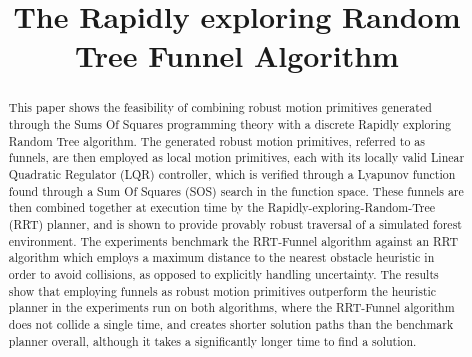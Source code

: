 \documentclass{IEEEtran}
\newcommand{\0}{\mathbf{0}}
\newcommand{\1}{\mathbf{1}}
\begin{document}
\title{The Rapidly exploring Random Tree Funnel Algorithm}

\author{}









\begin{abstract}
  This paper shows the feasibility of combining robust motion primitives generated through the Sums Of Squares programming theory with a discrete Rapidly exploring Random Tree algorithm. The generated robust motion primitives, referred to as funnels, are then employed as local motion primitives, each with its locally valid Linear Quadratic Regulator (LQR) controller, which is verified through a Lyapunov function found through a Sum Of Squares (SOS) search in the function space. These funnels are then combined together at execution time by the Rapidly-exploring-Random-Tree (RRT) planner, and is shown to provide provably robust traversal of a simulated forest environment. The experiments benchmark the RRT-Funnel algorithm against an RRT algorithm which employs a maximum distance to the nearest obstacle heuristic in order to avoid collisions, as opposed to explicitly handling uncertainty. The results show that employing funnels as robust motion primitives outperform the heuristic planner in the experiments run on both algorithms, where the RRT-Funnel algorithm does not collide a single time, and creates shorter solution paths than the benchmark planner overall, although it takes a significantly longer time to find a solution.
\end{abstract}
\end{document}
